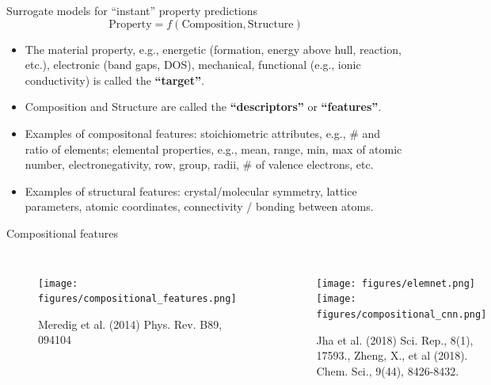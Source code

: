 \documentclass[aspectratio=169]{beamer}
\begin{document}
    \begin{frame}{Surrogate models for “instant” property predictions}
        \begin{equation*}
            \mathrm{Property} = f(\mathrm{Composition}, \mathrm{Structure})
        \end{equation*}
        \begin{itemize}
            \item The material property, e.g., energetic (formation, energy above hull, reaction, etc.), electronic (band gaps, DOS), mechanical, functional (e.g., ionic conductivity) is called the \textbf{``target''}.
            \item Composition and Structure are called the \textbf{``descriptors''} or \textbf{``features''}.
            \item Examples of compositonal features: stoichiometric attributes, e.g., \# and ratio of elements; elemental properties, e.g., mean, range, min, max of atomic number, electronegativity, row, group, radii, \# of valence electrons, etc.
            \item Examples of structural features: crystal/molecular symmetry, lattice parameters, atomic coordinates, connectivity / bonding between atoms.
        \end{itemize}
    \end{frame}


    \begin{frame}{Compositional features}

        \begin{columns}
            \begin{figure}
                \centering
                \texttt{[image: figures/compositional\_features.png]}
                \caption{Meredig et al. (2014) Phys. Rev. B89, 094104}
            \end{figure}
            \begin{figure}
                \centering
                \texttt{[image: figures/elemnet.png]}
                \texttt{[image: figures/compositional\_cnn.png]}
                \caption{Jha et al. (2018) Sci. Rep., 8(1), 17593., Zheng, X., et al (2018). Chem. Sci., 9(44), 8426-8432.}
            \end{figure}
        \end{columns}
    \end{frame}
\end{document}
